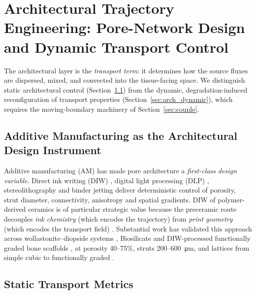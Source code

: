 \documentclass[11pt]{article}
\begin{document}
\section{Architectural Trajectory Engineering: Pore-Network Design and Dynamic Transport Control}
\label{sec:arch}


The architectural layer is the \emph{transport term}: it determines how the source fluxes are dispersed, mixed, and convected into the tissue-facing space. We distinguish static architectural control (Section~\ref{sec:arch_static}) from the dynamic, degradation-induced reconfiguration of transport properties (Section~\ref{sec:arch_dynamic}), which requires the moving-boundary machinery of Section~\ref{sec:couple}.


\subsection{Additive Manufacturing as the Architectural Design Instrument}
\label{sec:arch_static}


Additive manufacturing (AM) has made pore architecture a \emph{first-class design variable}. Direct ink writing (DIW) \cite{Elsayed2017,Liu2021, Workie2023}, digital light processing (DLP) \cite{Elsayed2018,Napolitano2020}, stereolithography \cite{Chamhibrahim2025} and binder jetting \cite{Tang2022} deliver deterministic control of porosity, strut diameter, connectivity, anisotropy and spatial gradients. DIW of polymer-derived ceramics is of particular strategic value because the preceramic route decouples \emph{ink chemistry} (which encodes the trajectory) from \emph{print geometry} (which encodes the transport field) \cite{Colombo2010,Li2026}. Substantial work has validated this approach across wollastonite--diopside systems \cite{Elsayed2017}, Biosilicate \cite{Elsayed2019} and DIW-processed functionally graded bone scaffolds \cite{Furlan2026,Elsayed2021}, at porosity 40--75\%, struts 200--600~\si{\micro\meter}, and lattices from simple cubic to functionally graded \cite{Elsayed2021,Su2025}.


\subsection{Static Transport Metrics}
\end{document}
